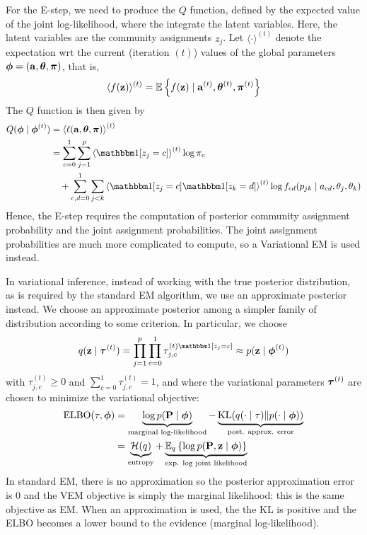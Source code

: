 \documentclass[english]{article}
\begin{document}
For the E-step, we need to produce the $Q$ function, defined by the expected value of the joint 
log-likelihood, where the integrate the latent variables. Here, the latent variables are the 
community assignments $z_j$. Let $\langle \cdot\rangle^{(t)}$ denote the expectation wrt the current
(iteration $(t)$) values of the global parameters ${\boldsymbol \phi}=({\mathbf a}, {\boldsymbol \theta}, {\boldsymbol \pi})$, that is,
\begin{align*}
    \langle f({\mathbf z})\rangle^{(t)}
    = 
    {\mathbb E}\left\{ f({\mathbf z}) \mid {\mathbf a}^{(t)}, {\boldsymbol \theta}^{(t)}, {\boldsymbol \pi}^{(t)}\right\}
\end{align*}
The $Q$ function is then given by
\begin{align*}
    Q(\bphi\mid\bphi^{(t)})
    &=
    \left\langle \ell(\ba,\btheta,\bpi) \right\rangle^{(t)} \\ 
    &=
    \sum_{c=0}^{1}\sum_{j=1}^{p}\left\langle \ind[z_j=c]\right\rangle^{(t)}\log\pi_c \\
    &\quad + 
    \sum_{c,d=0}^{1}\sum_{j<k} 
    \left\langle\ind[z_j=c]\ind[z_k=d]\right\rangle^{(t)}
    \log f_{cd}(p_{jk}\mid a_{cd}, \theta_j, \theta_k)
\end{align*}
Hence, the E-step requires the computation of posterior community assignment probability and the joint
assignment probabilities. The joint assignment probabilities are much more complicated to compute,
so a Variational EM is used instead.

In variational inference, instead of working with the true posterior distribution, as is required by
the standard EM algorithm, we use an approximate posterior instead. We choose an approximate posterior
among a simpler family of distribution according to some criterion. In particular, we choose
\begin{align*}
    q(\bz\mid\btau^{(t)} ) =  \prod_{j=1}^{p} \prod_{c=0}^{1} \tau_{j,c}^{(t)\ind[z_j=c]}
    \approx p(\bz\mid \bphi^{(t)})
\end{align*}
with $\tau_{j,c}^{(t)}\geqslant 0$ and $\sum_{c=0}^{1}\tau_{j,c}^{(t)}=1$, and 
where the variational parameters ${\boldsymbol \tau}^{(t)}$ are chosen to minimize the variational objective:
\begin{align*}
    \operatorname{ELBO}(\tau, {\boldsymbol \phi})
    &= 
    \underbrace{\log p({\mathbf P}\mid {\boldsymbol \phi})}_{\text{marginal log-likelihood}} 
    - \underbrace{\operatorname{KL}(q(\cdot\mid\tau) \Vert p(\cdot\mid {\boldsymbol \phi}))}_{\text{post. approx. error}} \\ 
    &= 
    \underbrace{\mathcal H(q)}_{\text{entropy}} 
    + \underbrace{{\mathbb E}_q\left\{\log p({\mathbf P}, {\mathbf z}\mid {\boldsymbol \phi})\right\}}_{\text{exp. log joint likelihood}} 
\end{align*}
In standard EM, there is no approximation so the posterior approximation error is 0 and the VEM
objective is simply the marginal likelihood: this is the same objective as EM. When an approximation
is used, the the KL is positive and the ELBO becomes a lower bound to the evidence (marginal
log-likelihood).
\end{document}
